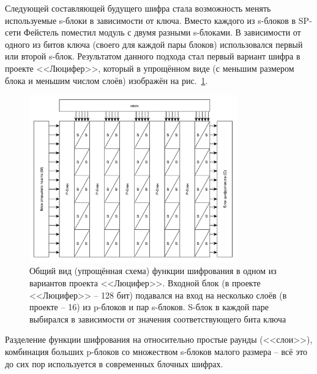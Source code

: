 Следующей составляющей будущего шифра стала возможность менять используемые s-блоки в зависимости от ключа. Вместо каждого из s-блоков в SP-сети Фейстель поместил модуль с двумя разными s-блоками. В зависимости от одного из битов ключа (своего для каждой пары блоков) использовался первый или второй s-блок. Результатом данного подхода стал первый вариант шифра в проекте <<Люцифер>>, который в упрощённом виде (с меньшим размером блока и меньшим числом слоёв) изображён на рис.~\ref{fig:lucifer}.

\begin{figure}[htb]
	\centering
	\includegraphics[width=0.8\textwidth]{pic/lucifer}
  \caption{Общий вид (упрощённая схема) функции шифрования в одном из вариантов проекта <<Люцифер>>. Входной блок (в проекте <<Люцифер>> -- 128 бит) подавался на вход на несколько слоёв (в проекте -- 16) из p-блоков и пар s-блоков. S-блок в каждой паре выбирался в зависимости от значения соответствующего бита ключа}
  \label{fig:lucifer}
\end{figure}

Разделение функции шифрования на относительно простые раунды (<<слои>>), комбинация больших p-блоков со множеством s-блоков малого размера -- всё это до сих пор используется в современных блочных шифрах.

